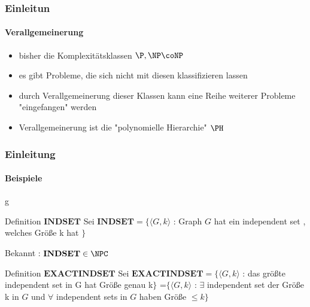 \begin{frame}
		\frametitle{Einleitun}
		\framesubtitle{Verallgemeinerung}
		
		\begin{itemize}[<+->]
			\item bisher die Komplexitätsklassen $\P, \NP \coNP$
			\item es gibt Probleme, die sich nicht mit diesen klassifizieren lassen
			\item durch Verallgemeinerung dieser Klassen kann eine Reihe weiterer Probleme "eingefangen" werden
			\item Verallgemeinerung ist die "polynomielle Hierarchie" $\PH$ 
		\end{itemize}
\end{frame}
\begin{frame}
	\frametitle{Einleitung}
	\framesubtitle{Beispiele}g
	
	\begin{KITinfoblock}{Definition $\mathbf{INDSET}$}
	Sei $\mathbf{INDSET} = \lbrace \langle G,k \rangle $ : Graph $G$ hat ein
	independent set , welches Größe k hat $\rbrace$
	\end{KITinfoblock}
	\bigskip
	\pause
	Bekannt : $\mathbf{INDSET} \in \NPC$
	\bigskip
	\pause
	\begin{KITinfoblock}{Definition $\mathbf{EXACT INDSET}$}
	Sei $\mathbf{EXACT INDSET} = \lbrace \langle G,k \rangle $ : das größte
	independent set in G hat Größe genau k$\rbrace$ \newline
	=$\lbrace \langle G,k \rangle$ : $\exists$ independent set der Größe k in $G$
	und $\forall$ independent sets in $G$ haben Größe $\leq k \rbrace$
	\end{KITinfoblock}
\end{frame}
